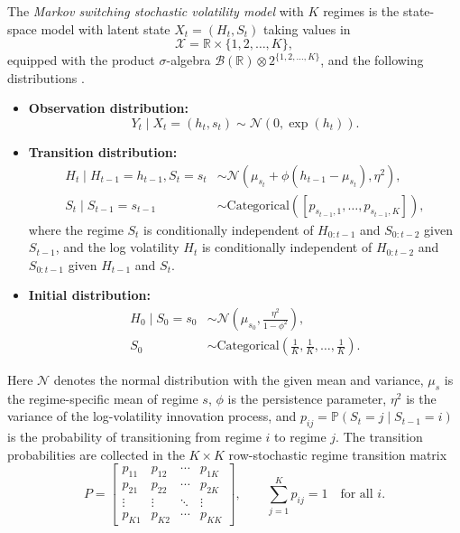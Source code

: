\begin{definition}
    \label{def:mssv}
    The \emph{Markov switching stochastic volatility model} with $K$ regimes is the state-space model with latent state $X_t = (H_t, S_t)$ taking values in
    \begin{equation}
        \mathcal{X} = \mathbb{R} \times \{1, 2, \ldots, K\},
    \end{equation}
    equipped with the product $\sigma$-algebra $\mathcal{B}(\mathbb{R}) \otimes 2^{\{1, 2, \ldots, K\}}$, and the following distributions \cite{so1998stochastic, carvalho2007simulation}.
    \begin{itemize}
        \item \textbf{Observation distribution:}
        \begin{equation}
            Y_t \mid X_t=(h_t, s_t) \sim \mathcal{N}\left(0, \exp\left(h_t\right)\right).
        \end{equation}
        \item \textbf{Transition distribution:}
        \begin{align}
            H_t \mid H_{t-1}=h_{t-1}, S_t=s_t &\sim \mathcal{N}(\mu_{s_t} + \phi(h_{t-1} - \mu_{s_t}), \eta^2), \\
            S_t \mid S_{t-1}=s_{t-1} &\sim \text{Categorical}([p_{s_{t-1},1}, \ldots, p_{s_{t-1},K}]),
        \end{align}
        where the regime $S_t$ is conditionally independent of $H_{0:t-1}$ and $S_{0:t-2}$ given $S_{t-1}$, and the log volatility $H_t$ is conditionally independent of $H_{0:t-2}$ and $S_{0:t-1}$ given $H_{t-1}$ and $S_t$.
        \item \textbf{Initial distribution:}
        \begin{align}
            H_0 \mid S_0=s_0 &\sim \mathcal{N}\left(\mu_{s_0}, \frac{\eta^2}{1 - \phi^2}\right), \\
            S_0 &\sim \text{Categorical}\left(\frac{1}{K}, \frac{1}{K}, \ldots, \frac{1}{K} \right).
        \end{align}
    \end{itemize}
    Here $\mathcal{N}$ denotes the normal distribution with the given mean and variance, $\mu_{s}$ is the regime-specific mean of regime $s$, $\phi$ is the persistence parameter, $\eta^2$ is the variance of the log-volatility innovation process, and $p_{ij} = \mathbb{P}(S_t = j \mid S_{t-1} = i)$ is the probability of transitioning from regime $i$ to regime $j$. The transition probabilities are collected in the $K \times K$ row-stochastic regime transition matrix
    \begin{equation}
        P=
        \begin{bmatrix}
            p_{11} & p_{12} & \cdots & p_{1K} \\
            p_{21} & p_{22} & \cdots & p_{2K} \\
            \vdots & \vdots & \ddots & \vdots \\
            p_{K1} & p_{K2} & \cdots & p_{KK}
        \end{bmatrix},
        \qquad \sum_{j=1}^{K} p_{ij} = 1 \quad \text{for all } i.
    \end{equation}
\end{definition}

